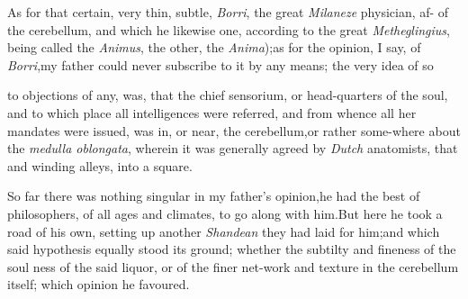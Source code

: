 \documentclass{article}
\begin{document}
As for that certain, very thin, subtle, 
\textit{Borri}, the great \textit{Milaneze} physician, af-\break
{}
of the cerebellum, and which he likewise
one, according to the great \textit{Metheglingius},
being called the \textit{Animus}, the other, the
\textit{Anima});\tsk as for the opinion, I say, of
\textit{Borri},\tsk my father could never subscribe to it by any
means; the very idea of so 

\noindent
{}
to objections of any, was, that the chief sensorium, or
head-quarters of the soul, and to which place all intelligences
were referred, and from whence all her mandates were issued,\tsk
was in, or near, the\break
cerebellum,\tsk or rather some-where about
the \textit{medulla oblongata}, wherein it was ge\-nerally agreed
by \textit{Dutch} anatomists, that
 and
winding alleys, into a square.

So far there was nothing singular in my father’s
opinion,\tsk he had the best of philosophers, of all ages and
climates, to go along with him.\tsk But here he took a\break
road of his own, setting up another \textit{Shan\-dean}  they had laid for him;\tsk and which
said hypothesis equally stood its ground; whe\-ther the subtilty and
fineness of the soul  ness of
the said liquor, or of the finer net-work and texture in the
cerebellum itself; which opinion he favoured.
\end{document}
